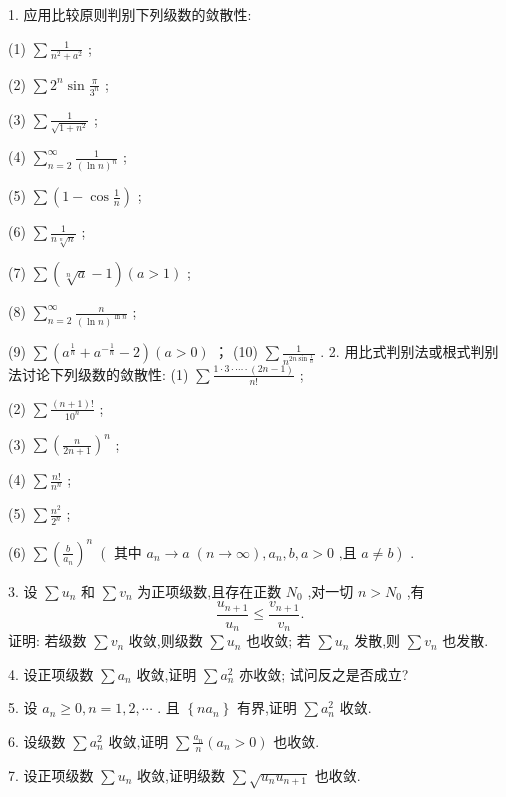 1. 应用比较原则判别下列级数的敛散性:

(1) \(\sum \frac{1}{{n}^{2} + {a}^{2}}\) ;

(2) \(\sum {2}^{n}\sin \frac{\pi }{{3}^{n}}\) ;

(3) \(\sum \frac{1}{\sqrt{1 + {n}^{2}}}\) ;

(4) \(\mathop{\sum }\limits_{{n = 2}}^{\infty }\frac{1}{{\left( \ln n\right) }^{n}}\) ;

(5) \(\sum \left( {1 - \cos \frac{1}{n}}\right)\) ;

(6) \(\sum \frac{1}{n\sqrt[n]{n}}\) ;

(7) \(\sum \left( {\sqrt[n]{a} - 1}\right) \left( {a > 1}\right)\) ;

(8) \(\mathop{\sum }\limits_{{n = 2}}^{\infty }\frac{n}{{\left( \ln n\right) }^{\ln n}}\) ;

(9) \(\sum \left( {{a}^{\frac{1}{n}} + {a}^{-\frac{1}{n}} - 2}\right) \left( {a > 0}\right)\) ； (10) \(\sum \frac{1}{{n}^{{2n}\sin \frac{1}{n}}}\) .  2. 用比式判别法或根式判别法讨论下列级数的敛散性: (1) \(\sum \frac{1 \cdot  3 \cdot  \cdots  \cdot  \left( {{2n} - 1}\right) }{n!}\) ;

(2) \(\sum \frac{\left( {n + 1}\right) !}{{10}^{n}}\) ;

(3) \(\sum {\left( \frac{n}{{2n} + 1}\right) }^{n}\) ;

(4) \(\sum \frac{n!}{{n}^{n}}\) ;

(5) \(\sum \frac{{n}^{2}}{{2}^{n}}\) ;

(6) \(\sum {\left( \frac{b}{{a}_{n}}\right) }^{n}\;\left( {\text{ 其中 }{a}_{n} \rightarrow  a\;\left( {n \rightarrow  \infty }\right) ,{a}_{n},b,a > 0\text{ ,且 }a \neq  b}\right)\) .

3. 设 \(\sum {u}_{n}\) 和 \(\sum {v}_{n}\) 为正项级数,且存在正数 \({N}_{0}\) ,对一切 \(n > {N}_{0}\) ,有
\[
\frac{{u}_{n + 1}}{{u}_{n}} \leq  \frac{{v}_{n + 1}}{{v}_{n}}.
\]
证明: 若级数 \(\sum {v}_{n}\) 收敛,则级数 \(\sum {u}_{n}\) 也收敛; 若 \(\sum {u}_{n}\) 发散,则 \(\sum {v}_{n}\) 也发散.

4. 设正项级数 \(\sum {a}_{n}\) 收敛,证明 \(\sum {a}_{n}^{2}\) 亦收敛; 试问反之是否成立?

5. 设 \({a}_{n} \geq  0,n = 1,2,\cdots\) . 且 \(\left\{  {n{a}_{n}}\right\}\) 有界,证明 \(\sum {a}_{n}^{2}\) 收敛.

6. 设级数 \(\sum {a}_{n}^{2}\) 收敛,证明 \(\sum \frac{{a}_{n}}{n}\left( {{a}_{n} > 0}\right)\) 也收敛.

7. 设正项级数 \(\sum {u}_{n}\) 收敛,证明级数 \(\sum \sqrt{{u}_{n}{u}_{n + 1}}\) 也收敛.

